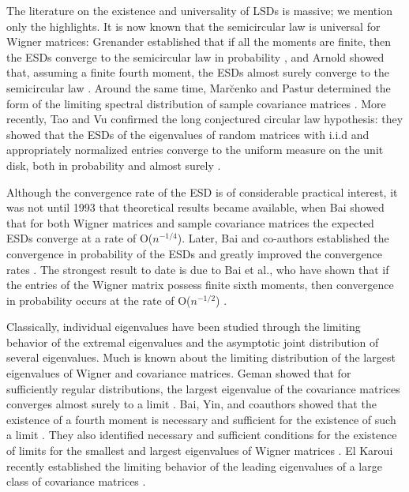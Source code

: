\documentclass[11pt,letterpaper,twoside,reqno,nosumlimits]{amsart}
\theoremstyle{remark}
\numberwithin{equation}{section}
\numberwithin{thm}{section}
\numberwithin{prop}{section}
\numberwithin{defn}{section}
\numberwithin{remark}{section}
\begin{document}
	The literature on the existence and universality of LSDs is massive; we mention only the highlights. It is now known that the semicircular law is universal for Wigner matrices: Grenander established that if all the moments are finite, then the ESDs converge to the semicircular law in probability \cite{Grenander63}, and Arnold showed that, assuming a finite fourth moment, the ESDs almost surely converge to the semicircular law \cite{Arnold71}. Around the same time, Mar\u{c}enko and Pastur determined the form of the limiting spectral distribution of sample covariance matrices \cite{MarcenkoPastur67}. More recently, Tao and Vu confirmed the long conjectured circular law hypothesis: they showed that the ESDs of the eigenvalues of random matrices with i.i.d and appropriately normalized entries converge to the uniform measure on the unit disk, both in probability and almost surely \cite{TaoVu10a}.


Although the convergence rate of the ESD is of considerable practical interest, it was not until 1993 that theoretical results became available, when Bai showed that for both Wigner matrices \cite{Bai93a} and sample covariance matrices \cite{Bai93b} the expected ESDs converge at a rate of O($n^{-1/4}$). Later, Bai and co-authors established the convergence in probability of the ESDs \cite{Bai97} and greatly improved the convergence rates \cite{BaiWigner99,Bai02,Bai03}. The strongest result to date is due to Bai et al., who have shown that if the entries of the Wigner matrix possess finite sixth moments, then convergence in probability occurs at the rate of O($n^{-1/2}$) \cite{Bai11}. 

Classically, individual eigenvalues have been studied through the limiting behavior of the extremal eigenvalues and the asymptotic joint distribution of several eigenvalues. Much is known about the limiting distribution of the largest eigenvalues of Wigner and covariance matrices. Geman showed that for sufficiently regular distributions, the largest eigenvalue of the covariance matrices converges almost surely to a limit \cite{Geman80}. Bai, Yin, and coauthors showed that the existence of a fourth moment is necessary and sufficient for the existence of such a limit \cite{YinBaiKrishnaiah88,BaiSilversteinYin88}. They also identified necessary and sufficient conditions for the existence of limits for the smallest and largest eigenvalues of Wigner matrices \cite{BY88b}. El Karoui recently established the limiting behavior of the leading eigenvalues of a large class of covariance matrices \cite{ElKaroui07}. 
\end{document}
